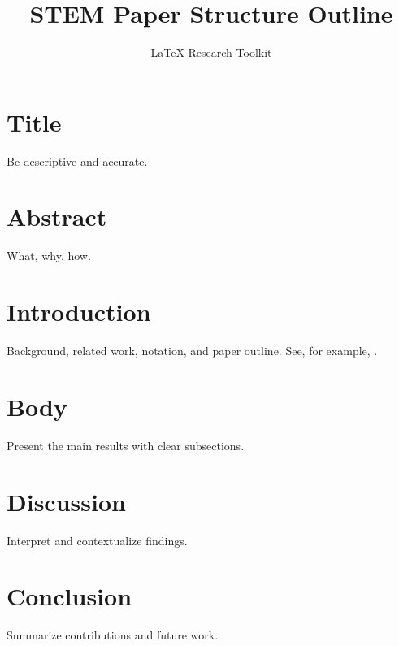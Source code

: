 \documentclass[11pt]{article}
\title{STEM Paper Structure Outline}
\author{LaTeX Research Toolkit}
\date{}
\begin{document}
\maketitle

\section{Title}
Be descriptive and accurate.

\section{Abstract}
What, why, how.

\section{Introduction}
Background, related work, notation, and paper outline. See, for example, \citep{smith2023}.

\section{Body}
Present the main results with clear subsections.

\section{Discussion}
Interpret and contextualize findings.

\section{Conclusion}
Summarize contributions and future work.



\end{document}
